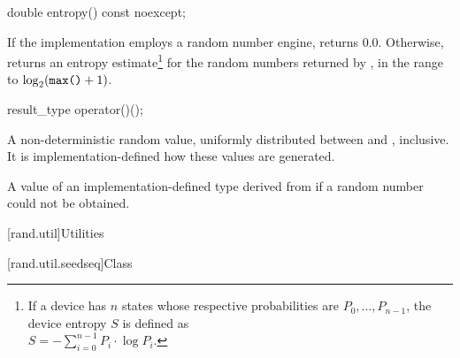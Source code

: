 %
%
\begin{itemdecl}
double entropy() const noexcept;
\end{itemdecl}

\begin{itemdescr}
\pnum\returns If the implementation employs a random number engine,
 returns $0.0$.
 Otherwise, returns an entropy estimate\footnote{If a device has $n$ states
   whose respective probabilities are
   $ P_0, \ldots, P_{n-1} $,
   the device entropy $S$ is defined as\\
   $ S = - \sum_{i=0}^{n-1} P_i \cdot \log P_i $.}
 for the random numbers returned by ,
 in the range
 to
   $\log_2( \texttt{max()}+1)$.
\end{itemdescr}

%
%
\begin{itemdecl}
result_type operator()();
\end{itemdecl}

\begin{itemdescr}
\pnum\returns A non-deterministic random value,
 uniformly distributed
 between  and ,
 inclusive.
 It is implementation-defined how these values are generated.

\pnum
\throws A value of an implementation-defined type
 derived from 
 if a random number could not be obtained.
\end{itemdescr}




[rand.util]{Utilities}%
%


[rand.util.seedseq]{Class }%

